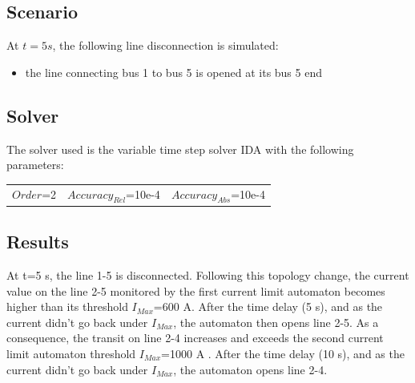 \documentclass[a4paper, 12pt]{report}
\begin{document}
\subsection{Scenario}
At $t=5s$, the following line disconnection is simulated:
\begin{itemize}
\item{the line connecting bus 1 to bus 5 is opened at its bus 5 end}
\end{itemize}

\subsection{Solver}
The solver used is the variable time step solver IDA with the following parameters:
\begin{center}
\begin{tabular}{l|l|l}
   $Order$=2 & $Accuracy_{Rel}$=10e-4 & $Accuracy_{Abs}$=10e-4 \\
\end{tabular}
\end{center}


\newpage
\subsection{Results}

At t=5 s, the line 1-5 is disconnected. Following this topology change, the current value on the line 2-5 monitored by the first current limit automaton becomes higher than its threshold $I_{Max}$=600 A. After the time delay (5 s), and as the current didn't go back under $I_{Max}$, the automaton then opens line 2-5.
As a consequence, the transit on line 2-4 increases and exceeds the second current limit automaton threshold $I_{Max}$=1000 A . After the time delay (10 s), and as the current didn't go back under $I_{Max}$, the automaton opens line 2-4. \\
\end{document}
